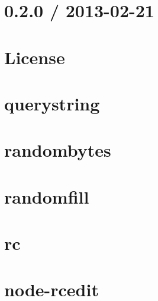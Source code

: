 \documentclass[twoside]{book}
\newcommand{\+}{\discretionary{\mbox{\scriptsize$\hookleftarrow$}}{}{}}
\begin{document}
\chapter{0.2.0 / 2013-\/02-\/21}
\label{md_dsmacc_examples_DRmerge_node_modules_querystring-es3_History}

\chapter{License}
\label{md_dsmacc_examples_DRmerge_node_modules_querystring-es3_License}

\chapter{querystring}
\label{md_dsmacc_examples_DRmerge_node_modules_querystring-es3_Readme}

\chapter{randombytes}
\label{md_dsmacc_examples_DRmerge_node_modules_randombytes_README}

\chapter{randomfill}
\label{md_dsmacc_examples_DRmerge_node_modules_randomfill_README}

\chapter{rc}
\label{md_dsmacc_examples_DRmerge_node_modules_rc_README}

\chapter{node-\/rcedit}
\label{md_dsmacc_examples_DRmerge_node_modules_rcedit_README}

\end{document}
